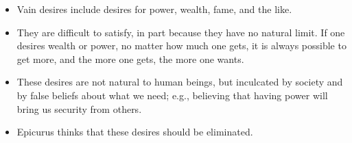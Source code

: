 \documentclass[]{article}
\begin{document}
\begin{itemize}
  \begin{itemize}
  \itemsep1pt\parskip0pt
  \item
    Vain desires include desires for power, wealth, fame, and the like.
  \item
    They are difficult to satisfy, in part because they have no natural
    limit. If one desires wealth or power, no matter how much one gets,
    it is always possible to get more, and the more one gets, the more
    one wants.
  \item
    These desires are not natural to human beings, but inculcated by
    society and by false beliefs about what we need; e.g., believing
    that having power will bring us security from others.
  \item
    Epicurus thinks that these desires should be eliminated.
  \end{itemize}
\end{itemize}
\end{document}
